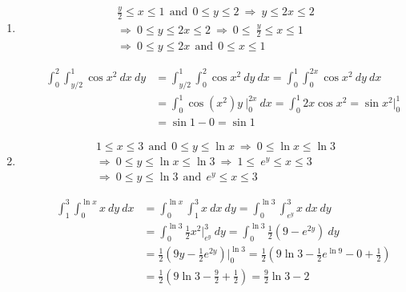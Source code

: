 \documentclass[12pt]{amsart}
\begin{document}
\begin{enumerate}
		\begin{enumerate}
		
			\item 
				\begin{align*}
					&\frac{y}{2} \le x \le 1 \ \ \text{and} \ \ 0 \le y \le 2 \ \Rightarrow \ y \le 2x \le 2 \\
					&\Rightarrow \ 0 \le y \le 2x \le 2 \ \Rightarrow \ 0 \le \ \frac{y}{2} \le x \le 1 \\
					&\Rightarrow \ 0 \le y \le 2x \ \ \text{and} \ \ 0 \le x \le 1
				\end{align*}
				
				\begin{align*}
					\ \ \ \ \ \ \ \ \ \int^2_0 \int^1_{y/2} \cos x^2 \ dx \ dy &= \int^1_{y/2} \int^2_0 \cos x^2 \ dy \ dx = \int^1_0 \int^{2x}_0 \cos x^2 \ dy \ dx \\
					&=\int^1_0 \cos (x^2)y \ \bigg|^{2x}_0 \ dx = \int^1_0 2x\cos x^2 = \sin x^2 \bigg|^1_0 \\
					&=\sin 1-0 = \sin 1
				\end{align*}
			
			\item
				\begin{align*}
					&1 \le x \le 3 \ \ \text{and} \ \ 0 \le y \le \ln x \ \Rightarrow \ 0 \le \ln x \le \ln 3 \\
					&\Rightarrow \ 0 \le y \le \ln x \le \ln 3 \ \Rightarrow \ 1 \le \ e^y \le x \le 3 \\
					&\Rightarrow \ 0 \le y \le \ln 3 \ \ \text{and} \ \ e^y \le x \le 3
				\end{align*}
				
				\begin{align*}
					\ \ \ \ \ \ \ \ \ \ \int^3_1 \int^{\ln x}_0 x \ dy \ dx &= \int^{\ln x}_0 \int^3_1 x \ dx \ dy = \int^{\ln 3}_0 \int^3_{e^y} x \ dx \ dy \\
					&=\int^{\ln 3}_0 \frac{1}{2}x^2 \bigg|^3_{e^y} \ dy = \int^{\ln 3}_0 \frac{1}{2} \left(9-e^{2y}\right) \ dy \\
					&= \frac{1}{2}\left(9y-\frac{1}{2}e^{2y}\right)\bigg|^{\ln 3}_0=\frac{1}{2}\left(9\ln 3-\frac{1}{2}e^{\ln 9}-0+\frac{1}{2}\right) \\
					&=\frac{1}{2}\left(9\ln 3-\frac{9}{2}+\frac{1}{2}\right)=\frac{9}{2} \ln 3-2 \\
				\end{align*}
			
		\end{enumerate}
				

\end{enumerate}
\end{document}
